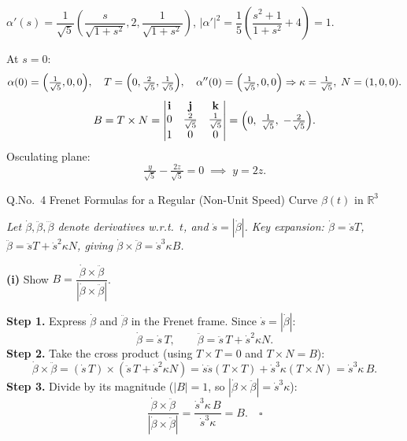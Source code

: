 \documentclass[12pt]{article}
\begin{document}
\begin{ansbox}
$\alpha'(s)=\dfrac{1}{\sqrt5}\!\left(\dfrac{s}{\sqrt{1+s^2}},2,\dfrac{1}{\sqrt{1+s^2}}\right)$,\quad
$|\alpha'|^2=\dfrac{1}{5}\!\left(\dfrac{s^2+1}{1+s^2}+4\right)=1$.\;\checkmark

At $s=0$:
\[
  \alpha(0)=\Bigl(\tfrac{1}{\sqrt5},0,0\Bigr),\quad T=\Bigl(0,\tfrac{2}{\sqrt5},\tfrac{1}{\sqrt5}\Bigr),\quad
  \alpha''(0)=\Bigl(\tfrac{1}{\sqrt5},0,0\Bigr)\Rightarrow\kappa=\tfrac{1}{\sqrt5},\;N=(1,0,0).
\]
\[
  B=T\times N=\begin{vmatrix}\mathbf{i}&\mathbf{j}&\mathbf{k}\\0&\frac{2}{\sqrt5}&\frac{1}{\sqrt5}\\1&0&0\end{vmatrix}
  =\Bigl(0,\;\tfrac{1}{\sqrt5},\;-\tfrac{2}{\sqrt5}\Bigr).
\]
Osculating plane:
\[
  \tfrac{y}{\sqrt5}-\tfrac{2z}{\sqrt5}=0\;\implies\;\boxed{y=2z}.
\]
\end{ansbox}

\newpage

\begin{tcolorbox}[colback=primary, colframe=primary, arc=0pt, boxrule=0pt,
  left=16pt, right=16pt, top=12pt, bottom=12pt,
  borderline south={4pt}{0pt}{accent}]
\end{tcolorbox}

\vspace{12pt}

\begin{qbox}{Q.No.\ 4}
Frenet Formulas for a Regular (Non-Unit Speed) Curve $\beta(t)$ in $\mathbb{R}^3$
\end{qbox}

\vspace{4pt}
{\small\color{darktext}\textit{Let $\dot\beta,\ddot\beta,\dddot\beta$ denote derivatives w.r.t.\ $t$, and $\dot s=|\dot\beta|$.
Key expansion: $\dot\beta=\dot sT$, $\ddot\beta=\ddot sT+\dot s^2\kappa N$, giving $\dot\beta\times\ddot\beta=\dot s^3\kappa B$.}}

\vspace{8pt}
\textbf{(i)} Show $B=\dfrac{\dot\beta\times\ddot\beta}{|\dot\beta\times\ddot\beta|}$.

\begin{ansbox}
\textbf{Step 1.} Express $\dot\beta$ and $\ddot\beta$ in the Frenet frame. Since $\dot s=|\dot\beta|$:
\[
  \dot\beta=\dot s\,T,\qquad \ddot\beta=\ddot s\,T+\dot s^2\kappa N.
\]
\textbf{Step 2.} Take the cross product (using $T\times T=0$ and $T\times N=B$):
\[
  \dot\beta\times\ddot\beta=(\dot s\,T)\times(\ddot s\,T+\dot s^2\kappa N)=\dot s\ddot s(T\times T)+\dot s^3\kappa(T\times N)=\dot s^3\kappa\, B.
\]
\textbf{Step 3.} Divide by its magnitude ($|B|=1$, so $|\dot\beta\times\ddot\beta|=\dot s^3\kappa$):
\[
  \frac{\dot\beta\times\ddot\beta}{|\dot\beta\times\ddot\beta|}=\frac{\dot s^3\kappa\, B}{\dot s^3\kappa}=B.\quad\square
\]
\end{ansbox}
\end{document}
